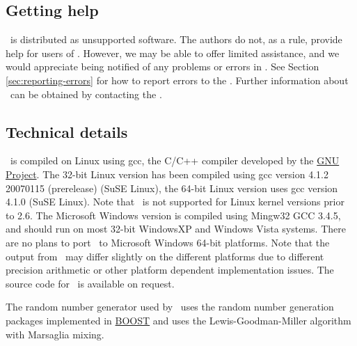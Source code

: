 \subsection{Getting help}

\SPM\ is distributed as unsupported software. The authors do not, as a rule, provide help for users of \SPM. However, we may be able to offer limited assistance, and we would appreciate being notified of any problems or errors in \SPM. See Section \ref{sec:reporting-errors} for how to report errors to the \authors. Further information about \SPM\ can be obtained by contacting the \authors.

\subsection{Technical details}

\SPM\ is compiled on Linux using gcc, the C/C++ compiler developed by the \href{http://gcc.gnu.org}{GNU Project}. The 32-bit Linux version has been compiled using gcc version 4.1.2 20070115 (prerelease) (SuSE Linux), the 64-bit Linux version uses gcc version 4.1.0 (SuSE Linux). Note that \SPM\ is not supported for Linux kernel versions prior to 2.6. The Microsoft Windows version is compiled using Mingw32 GCC 3.4.5, and should run on most 32-bit WindowsXP and Windows Vista systems. There are no plans to port \SPM\ to Microsoft Windows 64-bit platforms. Note that the output from \SPM\ may differ slightly on the different platforms due to different precision arithmetic or other platform dependent implementation issues. The source code for \SPM\ is available on request.

The random number generator used by \SPM\ uses the random number generation packages implemented in \href{http://www.boost.org/}{BOOST} and uses the Lewis-Goodman-Miller algorithm with Marsaglia mixing. 
